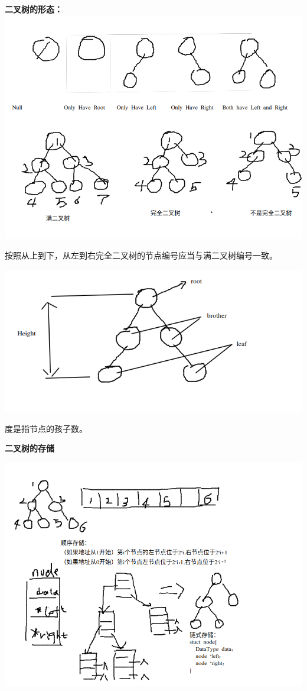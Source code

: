 \documentclass{article}
\begin{document}
	\textbf{二叉树的形态：}
	\includegraphics[scale=0.4]{./pic/tree-02.png}
	
	按照从上到下，从左到右完全二叉树的节点编号应当与满二叉树编号一致。

	\includegraphics[scale=0.4]{./pic/tree-02-1.png}

	度是指节点的孩子数。

	\textbf{二叉树的存储}

	\includegraphics[scale=0.4]{./pic/tree-03.png}
\end{document}
